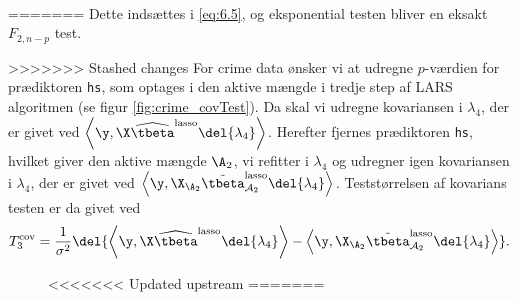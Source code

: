 \begin{eks} \\
=======
Dette indsættes i \eqref{eq:6.5}, og eksponential testen bliver en eksakt \(F_{2,n-p}\) test.

\begin{eks}
>>>>>>> Stashed changes
For crime data ønsker vi at udregne \(p\)-værdien for prædiktoren \texttt{hs}, som optages i den aktive mængde i tredje step af LARS algoritmen (se figur \ref{fig:crime_covTest}). 
Da skal vi udregne kovariansen i \(\lambda_4\), der er givet ved \(\left\langle \y, \X \widehat{\tbeta}^\text{lasso} \del{\lambda_4} \right\rangle\).
Herefter fjernes prædiktoren \texttt{hs}, hvilket giver den aktive mængde \(\A_{2}\), vi refitter i \(\lambda_4\) og udregner igen kovariansen i \(\lambda_4\), der er givet ved \(\left\langle  \y, \X_{\A_{2}} \tilde{\tbeta}^\text{lasso}_{\mathcal{A}_{2}} \del{\lambda_{4}} \right\rangle\).
Teststørrelsen af kovarians testen er da givet ved
\begin{align*}
T_3^\text{cov} = \frac{1}{\sigma^2} \del{ \left\langle \y, \X \widehat{\tbeta}^\text{lasso} \del{\lambda_{4}} \right\rangle - \left\langle  \y, \X_{\A_{2}} \tilde{\tbeta}^\text{lasso}_{\mathcal{A}_{2}} \del{\lambda_{4}} \right\rangle}.
\end{align*}
%
\begin{figure}[H]
\centering
<<<<<<< Updated upstream
=======

\end{figure}
\end{eks}
\end{eks}
